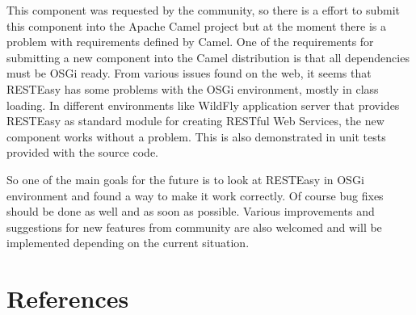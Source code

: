 \documentclass[12pt,final,oneside]{fithesis2}
\begin{document}
This component was requested by the community, so there is a effort to submit this component into the Apache Camel project but at the moment there is a problem with requirements defined by Camel. One of the requirements for submitting a new component into the Camel distribution is that all dependencies must be OSGi ready. From various issues found on the web, it seems that RESTEasy has some problems with the OSGi environment, mostly in class loading. In different environments like WildFly application server that provides RESTEasy as standard module for creating RESTful Web Services, the new component works without a problem. This is also demonstrated in unit tests provided with the source code. 

So one of the main goals for the future is to look at RESTEasy in OSGi environment and found a way to make it work correctly. Of course bug fixes should be done as well and as soon as possible. Various improvements and suggestions for new features from community are also welcomed and will be implemented depending on the current situation.







\begingroup
\def\tmpchapter{0}
\renewcommand{\chaptername}{}
\renewcommand{\thechapter}{}
\chapter{References}
\renewcommand{\chapter}[2]{}%
\end{document}
